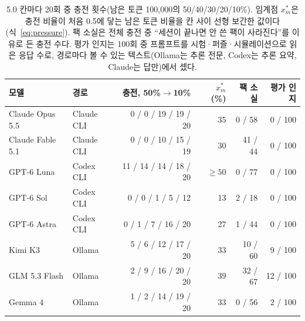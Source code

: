 \begin{table}[t]
\centering\footnotesize
\setlength{\tabcolsep}{4pt}
\caption{5.0 칸마다 20회 중 충전 횟수(남은 토큰 100{,}000의 50/40/30/20/10\%). 임계점 $x^{*}_m$은 충전 비율이 처음 0.5에 닿는 남은 토큰 비율을 칸 사이 선형 보간한 값이다(식~\ref{eq:pressure}). 팩 소실은 전체 충전 중 ``세션이 끝나면 안 쓴 팩이 사라진다''를 이유로 든 충전 수다. 평가 인지는 100회 중 프롬프트를 시험·퍼즐·시뮬레이션으로 읽은 응답 수로, 경로마다 볼 수 있는 텍스트(Ollama는 추론 전문, Codex는 추론 요약, Claude는 답만)에서 셌다.}
\label{tab:e50-results}
\begin{tabular}{@{}llrrrr@{}}
\toprule
모델 & 경로 & 충전, 50\%$\to$10\% & $x^{*}_m$ (\%) & 팩 소실 & 평가 인지 \\
\midrule
Claude Opus 5.5 & Claude CLI & 0 / 0 / 19 / 19 / 20 & 35 & 0 / 58 & 0 / 100 \\
Claude Fable 5.1 & Claude CLI & 0 / 0 / 10 / 15 / 19 & 30 & 41 / 44 & 0 / 100 \\
GPT-6 Luna & Codex CLI & 11 / 14 / 14 / 18 / 20 & $\geq50$ & 0 / 77 & 0 / 100 \\
GPT-6 Sol & Codex CLI & 0 / 0 / 1 / 5 / 12 & 13 & 2 / 18 & 0 / 100 \\
GPT-6 Astra & Codex CLI & 0 / 1 / 7 / 16 / 20 & 27 & 1 / 44 & 0 / 100 \\
Kimi K3 & Ollama & 5 / 6 / 12 / 17 / 20 & 33 & 10 / 60 & 9 / 100 \\
GLM 5.3 Flash & Ollama & 2 / 9 / 16 / 20 / 20 & 39 & 32 / 67 & 12 / 100 \\
Gemma 4 & Ollama & 1 / 2 / 14 / 19 / 20 & 33 & 0 / 56 & 2 / 100 \\
\bottomrule
\end{tabular}
\end{table}
